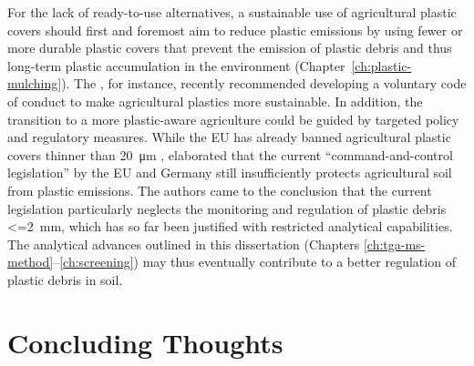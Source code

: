 For the lack of ready-to-use alternatives, a sustainable use of agricultural plastic covers should first and foremost aim to reduce plastic emissions by using fewer or more durable plastic covers that prevent the emission of plastic debris and thus long-term plastic accumulation in the environment (Chapter~\ref{ch:plastic-mulching}).
The \citet{FAOAssessment2021}, for instance, recently recommended developing a voluntary code of conduct to make agricultural plastics more sustainable. In addition, the transition to a more plastic-aware agriculture could be guided by targeted policy and regulatory measures. While the EU has already banned agricultural plastic covers thinner than \SI{20}{\micro\meter} \citep[Chapter~\ref{ch:screening};][]{EN13655Plastics2018}, \citet{StubenrauchPlastic2020} elaborated that the current ``command-and-control legislation'' by the EU and Germany still insufficiently protects agricultural soil from plastic emissions. The authors came to the conclusion that the current legislation particularly neglects the monitoring and regulation of plastic debris \SI{<=2}{\milli\meter}, which has so far been justified with restricted analytical capabilities. The analytical advances outlined in this dissertation (Chapters \ref{ch:tga-ms-method}--\ref{ch:screening}) may thus eventually contribute to a better regulation of plastic debris in soil.

\section{Concluding Thoughts}
\label{sec:general-discussion:conclusion}

